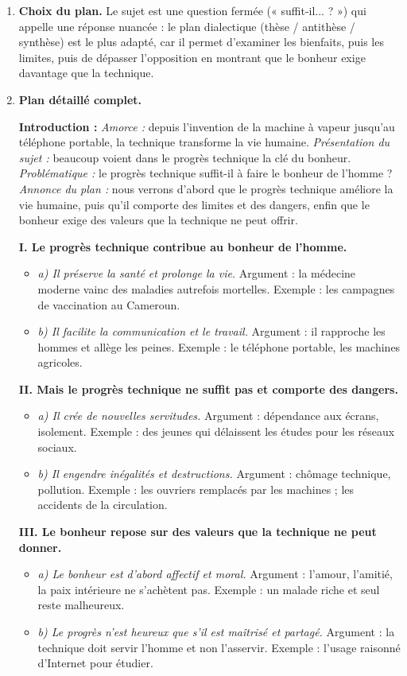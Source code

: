 \documentclass[11pt]{article}
\newcommand{\cle}[1]{{\popxbold\color{popdark}#1}}
\begin{document}
\begin{corrige}
\begin{enumerate}
\item \textbf{Choix du plan.} Le sujet est une question fermée (« suffit-il... ? ») qui appelle une réponse nuancée : le \cle{plan dialectique} (thèse / antithèse / synthèse) est le plus adapté, car il permet d'examiner les bienfaits, puis les limites, puis de dépasser l'opposition en montrant que le bonheur exige davantage que la technique.

\item \textbf{Plan détaillé complet.}

\textbf{Introduction :} \emph{Amorce :} depuis l'invention de la machine à vapeur jusqu'au téléphone portable, la technique transforme la vie humaine. \emph{Présentation du sujet :} beaucoup voient dans le progrès technique la clé du bonheur. \emph{Problématique :} le progrès technique suffit-il à faire le bonheur de l'homme ? \emph{Annonce du plan :} nous verrons d'abord que le progrès technique améliore la vie humaine, puis qu'il comporte des limites et des dangers, enfin que le bonheur exige des valeurs que la technique ne peut offrir.

\textbf{I. Le progrès technique contribue au bonheur de l'homme.}
\begin{itemize}
\item \emph{a) Il préserve la santé et prolonge la vie.} Argument : la médecine moderne vainc des maladies autrefois mortelles. Exemple : les campagnes de vaccination au Cameroun.
\item \emph{b) Il facilite la communication et le travail.} Argument : il rapproche les hommes et allège les peines. Exemple : le téléphone portable, les machines agricoles.
\end{itemize}

\textbf{II. Mais le progrès technique ne suffit pas et comporte des dangers.}
\begin{itemize}
\item \emph{a) Il crée de nouvelles servitudes.} Argument : dépendance aux écrans, isolement. Exemple : des jeunes qui délaissent les études pour les réseaux sociaux.
\item \emph{b) Il engendre inégalités et destructions.} Argument : chômage technique, pollution. Exemple : les ouvriers remplacés par les machines ; les accidents de la circulation.
\end{itemize}

\textbf{III. Le bonheur repose sur des valeurs que la technique ne peut donner.}
\begin{itemize}
\item \emph{a) Le bonheur est d'abord affectif et moral.} Argument : l'amour, l'amitié, la paix intérieure ne s'achètent pas. Exemple : un malade riche et seul reste malheureux.
\item \emph{b) Le progrès n'est heureux que s'il est maîtrisé et partagé.} Argument : la technique doit servir l'homme et non l'asservir. Exemple : l'usage raisonné d'Internet pour étudier.
\end{itemize}


\end{enumerate}
\end{corrige}
\end{document}
